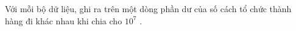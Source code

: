 Với mỗi bộ dữ liệu, ghi ra trên một dòng phần dư của số cách tổ chức thành hàng đi khác nhau khi chia cho $10^{7}$ .